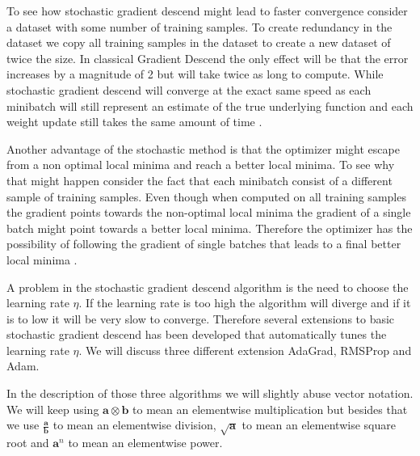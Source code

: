 To see how stochastic gradient descend might lead to faster convergence consider
a dataset with some number of training samples. To create redundancy in the
dataset we copy all training samples in the dataset to create a new dataset of
twice the size. In classical Gradient Descend the only effect will be that the
error increases by a magnitude of 2 but will take twice as long to compute.
While stochastic gradient descend will converge at the exact same speed as each
minibatch will still represent an estimate of the true underlying function and
each weight update still takes the same amount of time \citep{Bishop}.

Another advantage of the stochastic method is that the optimizer might escape
from a non optimal local minima and reach a better local minima. To see why that
might happen consider the fact that each minibatch consist of a different sample
of training samples. Even though when computed on all training samples the
gradient points towards the non-optimal local minima the gradient of a single
batch might point towards a better local minima. Therefore the optimizer has the
possibility of following the gradient of single batches that leads to a final
better local minima \citep{Bishop}.

A problem in the stochastic gradient descend algorithm is the need to choose
the learning rate $\eta$. If the learning rate is too high the algorithm
will diverge and if it is to low it will be very slow to converge. Therefore
several extensions to basic stochastic gradient descend has been developed that
automatically tunes the learning rate $\eta$. We will discuss three different
extension \gls{AdaGrad}, \gls{RMSProp} and \gls{Adam}.

In the description of those three algorithms we will slightly abuse
vector notation. We will keep using $\mathbf{a} \otimes \mathbf{b}$
to mean an elementwise multiplication but besides that we use
$\frac{\mathbf{a}}{\mathbf{b}}$ to mean an elementwise division,
$\sqrt{\mathbf{a}}$ to mean an elementwise square root and $\mathbf{a}^n$ to
mean an elementwise power.

